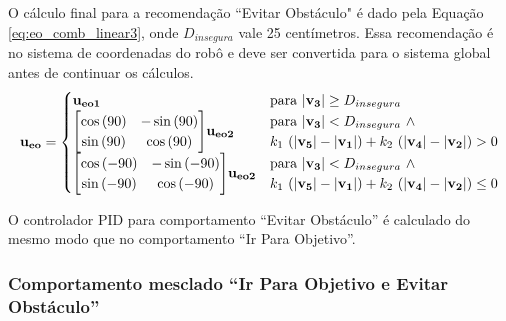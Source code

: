 		O cálculo final para a recomendação ``Evitar Obstáculo" é dado pela Equação 
		\ref{eq:eo_comb_linear3}, onde $D_{insegura}$ vale 25 centímetros. Essa recomendação 
		é no sistema de coordenadas do robô e deve ser convertida para o sistema global antes 
		de continuar os cálculos.
		\begin{equation}
			\label{eq:eo_comb_linear3}
			\mathbf{u_{eo}} = 
			\begin{cases}
				\mathbf{u_{eo1}} & \text{para} \ | \mathbf{v_3} | \geq D_{insegura} \\
				
				\mleft[
				\begin{matrix}
		  			\cos{(90)} & -\sin{(90)} \\
		  			\sin{(90)} & \cos{(90)} \\
				\end{matrix}
				\mright] \mathbf{u_{eo2}} & 				
				\begin{matrix*}[l]
		  			\text{para} \ | \mathbf{v_3} | < D_{insegura} \ \land \\
		  			k_1 \ (|\mathbf{v_5}| - |\mathbf{v_1}|) + k_2 \ (|\mathbf{v_4}| - |\mathbf{v_2}|)
					> 0 \\
				\end{matrix*} \\
				
				\mleft[
				\begin{matrix}
		  			\cos{(-90)} & -\sin{(-90)} \\
		  			\sin{(-90)} & \cos{(-90)} \\
				\end{matrix}
				\mright] \mathbf{u_{eo2}} & 
				\begin{matrix*}[l]
		  			\text{para} \ | \mathbf{v_3} | < D_{insegura} \ \land \\
		  			k_1 \ (|\mathbf{v_5}| - |\mathbf{v_1}|) + k_2 \ (|\mathbf{v_4}| - |\mathbf{v_2}|)
					\leq 0 \\
				\end{matrix*} \\
			\end{cases}
		\end{equation}
		
		O controlador PID para comportamento ``Evitar Obstáculo'' é calculado do mesmo modo
		que no comportamento ``Ir Para Objetivo''.
		
		\subsubsection{Comportamento mesclado ``Ir Para Objetivo e Evitar Obstáculo''}
		
